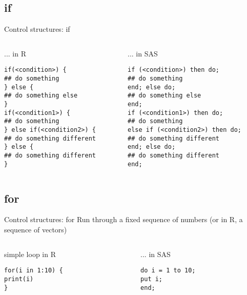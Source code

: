 \documentclass[xcolor=table,compress]{beamer}
\begin{document}
\subsection{if}
\begin{frame}[fragile]{Control structures: if}
\begin{columns}
\begin{column}[t]{.48\textwidth}
\pause
\begin{block}{... in R}
\begin{verbatim}
if(<condition>) {
## do something
} else {
## do something else
}
if(<condition1>) {
## do something
} else if(<condition2>) {
## do something different
} else {
## do something different
}
\end{verbatim}
\end{block}
\end{column}
\hfill\pause
\begin{column}[t]{.48\textwidth}
\begin{block}{... in SAS}
\begin{verbatim}
if (<condition>) then do;
## do something
end; else do;
## do something else
end;
if (<condition1>) then do;
## do something
else if (<condition2>) then do;
## do something different
end; else do;
## do something different
end;
\end{verbatim}
\end{block}
\end{column}
\end{columns}
\end{frame}




\subsection{for}

\begin{frame}[fragile]{Control structures: for}
Run through a fixed sequence of numbers (or in R, a sequence of vectors)
\begin{columns}
\begin{column}[t]{.48\textwidth}
\pause
\begin{block}{simple loop in R}
\begin{verbatim}
for(i in 1:10) {
print(i)
}
\end{verbatim}
\end{block}
\end{column}
\hfill\pause
\begin{column}[t]{.48\textwidth}
\begin{block}{... in SAS}
\begin{verbatim}
do i = 1 to 10;
put i;
end;
\end{verbatim}
\end{block}
\end{column}

\end{columns}
\end{frame}
\end{document}
